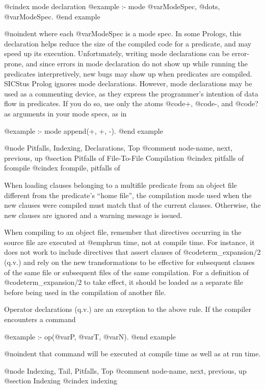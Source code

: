 @cindex mode declaration
@example
:- mode @var{ModeSpec}, @dots{}, @var{ModeSpec}.
@end example

@noindent
where each @var{ModeSpec} is a mode spec.  In some Prologs, this declaration
helps reduce the size of the compiled code for a predicate, and may speed
up its execution.  Unfortunately, writing mode declarations can be
error-prone, and since errors in mode declaration do not show up while
running the predicates interpretively, new bugs may show up when predicates
are compiled.  SICStus Prolog ignores mode declarations.  However, mode
declarations may be used as a commenting device, as they express the
programmer's intention of data flow in predicates.  If you do so, use only
the atoms @code{+}, @code{-}, and @code{?} as arguments in your mode specs,
as in

@example
:- mode append(+, +, -).
@end example

@node Pitfalls, Indexing, Declarations, Top
@comment  node-name,  next,  previous,  up
@section Pitfalls of File-To-File Compilation
@cindex pitfalls of fcompile
@cindex fcompile, pitfalls of

When loading clauses belonging to a multifile predicate from an object
file different from the predicate's ``home file'', the compilation mode
used when the new clauses were compiled must match that of the current
clauses.  Otherwise, the new clauses are ignored and a warning message
is issued.

When compiling to an object file, remember that directives occurring in
the source file are executed at @emph{run time}, not at compile time.
For instance, it does not work to include directives that assert clauses
of @code{term_expansion/2} (q.v.) and rely on the new transformations to
be effective for subsequent clauses of the same file or subsequent files
of the same compilation.  For a definition of @code{term_expansion/2} to
take effect, it should be loaded as a separate file before being used in
the compilation of another file.

Operator declarations (q.v.) are an exception to the above rule.  If the
compiler encounters a command

@example
:- op(@var{P}, @var{T}, @var{N}).
@end example

@noindent
that command will be executed at compile time as well as at run time.

@node Indexing, Tail, Pitfalls, Top
@comment  node-name,  next,  previous,  up
@section Indexing
@cindex indexing

